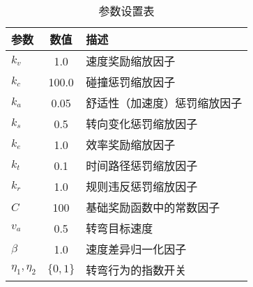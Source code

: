 \begin{table}[htbp]
	\centering
	\caption{参数设置表}
	\label{tab:parameters}
	\begin{tabular}{lcl}
		\toprule
		\textbf{参数} & \textbf{数值} & \textbf{描述} \\
		\midrule
		\( k_v \)     & 1.0     & 速度奖励缩放因子 \\
		\( k_c \)     & 100.0   & 碰撞惩罚缩放因子 \\
		\( k_a \)     & 0.05    & 舒适性（加速度）惩罚缩放因子 \\
		\( k_s \)     & 0.5     & 转向变化惩罚缩放因子 \\
		\( k_e \)     & 1.0     & 效率奖励缩放因子 \\
		\( k_t \)     & 0.1     & 时间路径惩罚缩放因子 \\
		\( k_r \)     & 1.0     & 规则违反惩罚缩放因子 \\
		\( C \)       & 100     & 基础奖励函数中的常数因子 \\
		\( v_a \)     & 0.5     & 转弯目标速度 \\
		\(\beta\)    & 1.0     & 速度差异归一化因子 \\
		\(\eta_1, \eta_2\) & \(\{0, 1\}\) & 转弯行为的指数开关 \\
		\bottomrule
	\end{tabular}
\end{table}























